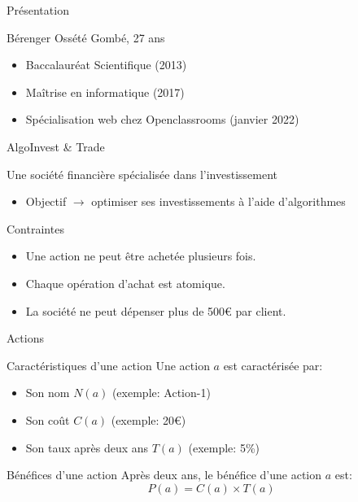 \begin{frame}{Présentation}

  \begin{block}{Bérenger Ossété Gombé, 27 ans}
    \begin{itemize}
    \item Baccalauréat Scientifique (2013)
    \item Maîtrise en informatique (2017)
    \item Spécialisation web chez Openclassrooms (janvier 2022)
    \end{itemize}
  \end{block}
  
\end{frame}

\begin{frame}{AlgoInvest \& Trade}
  \begin{block}{Une société financière spécialisée dans l'investissement}
    \begin{itemize}
    \item Objectif $\rightarrow$ optimiser ses investissements à l'aide d'algorithmes
    \end{itemize}

    \begin{block}{Contraintes}
      \begin{itemize}
      \item Une action ne peut être achetée plusieurs fois.
      \item Chaque opération d'achat est atomique.
      \item La société ne peut dépenser plus de 500€ par client.
      \end{itemize}
    \end{block}
  \end{block}
\end{frame}


\begin{frame}{Actions}
  \begin{block}{Caractéristiques d'une action}
    Une action $a$ est caractérisée par:
    \begin{itemize}
    \item Son nom $N(a)$ (exemple: Action-1)
    \item Son coût $C(a)$ (exemple: 20€)
    \item Son taux après deux ans $T(a)$ (exemple: 5\%)
    \end{itemize}
  \end{block}

  \begin{block}{Bénéfices d'une action}
    Après deux ans, le bénéfice d'une action $a$ est:
    \begin{equation}
      P(a) = C(a) \times T(a)
    \end{equation}
  \end{block}
\end{frame}

